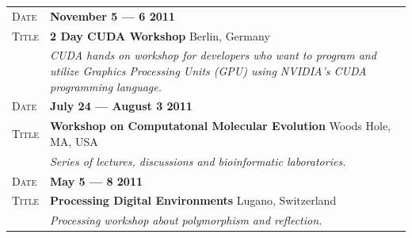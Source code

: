 \documentclass[a4paper, oneside, final]{scrartcl}
\newenvironment{lyxlist}[1]
{\begin{list}{}
{\settowidth{\labelwidth}{#1}
 \setlength{\leftmargin}{\labelwidth}
 \addtolength{\leftmargin}{\labelsep}
 \renewcommand{\makelabel}[1]{##1\hfil}}}
{\end{list}}
\newcommand{\noun}[1]{\textsc{#1}}
\newcommand{\gray}{\rowcolor[gray]{.90}}
\begin{document}
\begin{center}
\begin{tabularx}{0.97\linewidth}{>{\raggedleft\scshape}p{2cm}X}
       \gray Date & \textbf{November 5 --- 6 2011}\\
    \gray Title  & \textbf{2 Day CUDA Workshop} \hfill Berlin, Germany\\
           & \emph{CUDA hands on workshop for developers who want to program and utilize Graphics Processing Units (GPU) using NVIDIA’s CUDA programming language.}
   \\
       
       \gray Date & \textbf{July 24 --- August 3 2011}\\
    \gray Title  & \textbf{Workshop on Computatonal Molecular Evolution} \hfill Woods Hole, MA, USA\\
           & \emph{Series of lectures, discussions and bioinformatic laboratories.}
   \\
   
       \gray Date & \textbf{May 5 --- 8 2011 }\\
    \gray Title  & \textbf{Processing Digital Environments} \hfill Lugano, Switzerland\\
           & \emph{Processing workshop about polymorphism and reflection.}
    \end{tabularx}

% 
%     
% 
  
     

\end{center}
\end{document}
